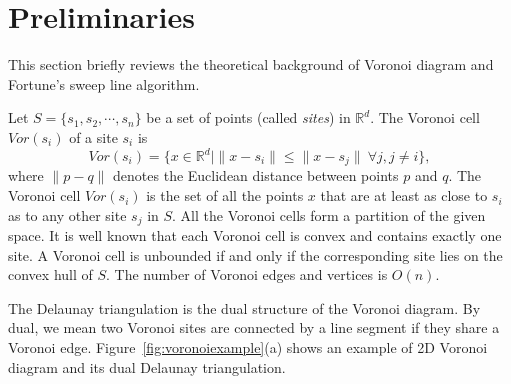 \section{Preliminaries}\label{sec:sweepcircle-preliminaries}
\vspace{-0.1in} This section briefly reviews the theoretical
background of Voronoi diagram and Fortune's sweep line algorithm.

Let $S=\{s_1,s_2,\cdots,s_n\}$ be a set of points (called {\em sites}) in
$\mathbb{R}^d$. The Voronoi cell $Vor(s_i)$ of a site $s_i$ is
\[
Vor(s_i)=\{x\in\mathbb{R}^d|\|x-s_i\|\leq\|x-s_j\|~\forall j, j\neq
i\},
\]
where $\|p-q\|$ denotes the Euclidean distance between points $p$
and $q$. The Voronoi cell $Vor(s_i)$ is the set of all the points
$x$ that are at least as close to $s_i$ as to any other site $s_j$
in $S$. All the Voronoi cells form a partition of the given space.
It is well known that each Voronoi cell is convex and contains
exactly one site. A Voronoi cell is unbounded if and only if the
corresponding site lies on the convex hull of $S$. The number of
Voronoi edges and vertices is $O(n)$.

The Delaunay triangulation is the dual structure of the Voronoi
diagram. By dual, we mean two Voronoi sites are
connected by a line segment if they share a Voronoi edge.
Figure~\ref{fig:voronoiexample}(a) shows an example of 2D Voronoi
diagram and its dual Delaunay triangulation.

